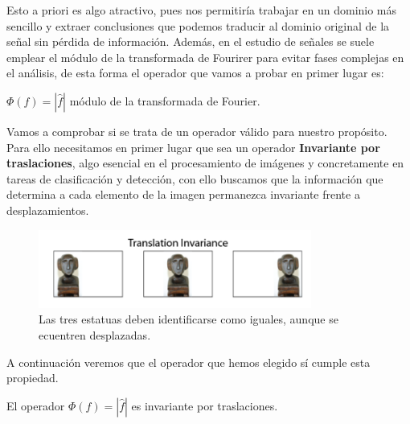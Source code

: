 \medskip

\noindent Esto a priori es algo atractivo, pues nos permitiría trabajar en un dominio más sencillo y extraer conclusiones que podemos traducir al dominio original de la señal sin pérdida de información. Además, en el estudio de señales se suele emplear el módulo de la transformada de Fourirer para evitar fases complejas en el análisis, de esta forma el operador que vamos a probar en primer lugar es: 

\begin{definicion}
$\Phi(f)=|\widehat{f}|$ módulo de la transformada de Fourier. 
\end{definicion}

\noindent Vamos a comprobar si se trata de un operador válido para nuestro propósito. Para ello necesitamos en primer lugar que sea un operador \textbf{Invariante por traslaciones}, algo esencial en el procesamiento de imágenes y concretamente en tareas de clasificación y detección, con ello buscamos que la información que determina a cada elemento de la imagen permanezca invariante frente a desplazamientos.

\begin{figure} [!h]
    \centering
    \includegraphics[width=0.8\textwidth]{img/translation_invariance.png}
    \caption{Las tres estatuas deben identificarse como iguales, aunque se ecuentren desplazadas.}
    \label{fig:invarianza_traslaciones}
\end{figure}

\medskip

\noindent A continuación veremos que el operador que hemos elegido sí cumple esta propiedad.

\begin{lema}
    El operador $\Phi(f)=|\widehat{f}|$ es invariante por traslaciones.
\end{lema}

